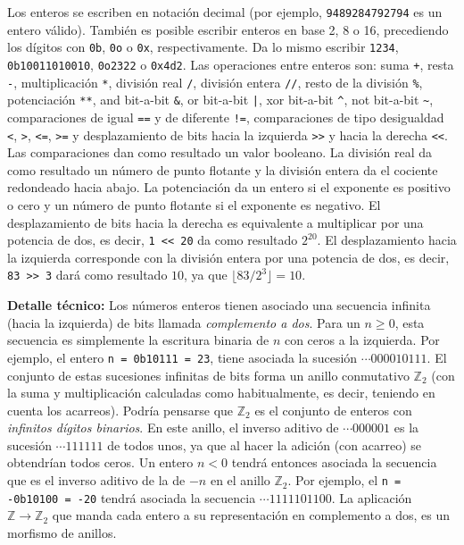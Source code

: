 \documentclass[a4paper, 11pt]{article}
\newcommand{\ZZ}{\mathbb{Z}}
\theoremstyle{plain}
\theoremstyle{definition}
\begin{document}
\bigskip

Los enteros se escriben en notación decimal (por ejemplo, \texttt{9489284792794}
es un entero válido). También es posible escribir enteros en base 2, 8 o 16,
precediendo los dígitos con \texttt{0b}, \texttt{0o} o \texttt{0x}, respectivamente.
Da lo mismo escribir \texttt{1234}, \texttt{0b10011010010}, \texttt{0o2322} o
\texttt{0x4d2}. Las operaciones entre enteros son: suma \texttt{+}, resta
\texttt{-}, multiplicación \texttt{*}, división real \texttt{/}, división
entera \texttt{//}, resto de la división \texttt{\%}, potenciación \texttt{**},
and bit-a-bit \texttt{\&}, or bit-a-bit \texttt{|}, xor bit-a-bit \texttt{\^}, not
bit-a-bit \texttt{\~}, comparaciones de igual \texttt{==} y de diferente
\texttt{!=}, comparaciones de tipo desigualdad \texttt{<}, \texttt{>},
\texttt{<=}, \texttt{>=} y desplazamiento de bits hacia la izquierda \texttt{>>}
y hacia la derecha \texttt{<<}. Las comparaciones dan como resultado un valor
booleano. La división real da como resultado un número de punto flotante y la
división entera da el cociente redondeado hacia abajo. La potenciación da un
entero si el exponente es positivo o cero y un número de punto flotante si el
exponente es negativo. El desplazamiento de bits hacia la derecha es equivalente
a multiplicar por una potencia de dos, es decir, \texttt{1 << 20} da como
resultado $2^{20}$. El desplazamiento hacia la izquierda corresponde con la
división entera por una potencia de dos, es decir, \texttt{83 >> 3} dará como
resultado $10$, ya que $\lfloor83/2^3\rfloor=10$.

\bigskip

{\bf Detalle técnico:} Los números enteros tienen asociado una secuencia infinita
(hacia la izquierda) de bits llamada \emph{complemento a dos}. Para un $n\geq0$,
esta secuencia es simplemente la escritura binaria de $n$ con ceros a la izquierda.
Por ejemplo, el entero \texttt{n = 0b10111 = 23}, tiene asociada la sucesión
$\cdots 000010111$.
El conjunto de estas sucesiones infinitas de bits forma un anillo conmutativo
$\ZZ_2$ (con la suma y multiplicación calculadas como habitualmente, es decir,
teniendo en cuenta los acarreos). Podría pensarse que $\ZZ_2$ es el conjunto de
enteros con \emph{infinitos dígitos binarios}. En este anillo, el inverso aditivo
de $\cdots 000001$ es la sucesión $\cdots 111111$ de todos unos, ya que al hacer
la adición (con acarreo) se obtendrían todos ceros. Un entero $n<0$ tendrá entonces
asociada la secuencia que es el inverso aditivo de la de $-n$ en el anillo $\ZZ_2$.
Por ejemplo, el \texttt{n = -0b10100 = -20} tendrá asociada la secuencia
$\cdots 1111101100$. La aplicación $\ZZ\to\ZZ_2$ que manda cada entero a su
representación en complemento a dos, es un morfismo de anillos.
\end{document}
